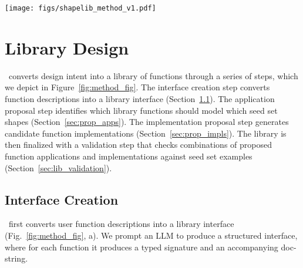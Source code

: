 \begin{figure*}[t!]
\centering
  \texttt{[image: figs/shapelib\_method\_v1.pdf]}
   \caption{Method overview. We design a function library in four steps, starting from a user intent (light blue) that consists of function descriptions and a set of seed shapes. First, (a) we prompt an LLM to create function interfaces that define parameters and annotate the function's purpose. Then, (b) the LLM is prompted to propose multiple applications of the functions that reconstruct the seed shapes. Next, (c) we use this information to guide the LLM to propose multiple function implementations. The library is finalized with a validation step (d) that searches for pairs of  applications and implementations that best reconstruct the seed shapes. We can use the library to extend beyond the seed shapes by guiding the LLM to author a synthetic data generator with the library functions, and using the resulting paired data to train a recognition network for visual program induction.
   } 
  \label{fig:method_fig}
\end{figure*}


\section{Library Design}
\label{sec:lib_design}

\methodname~converts design intent into a library of functions through a series of steps, which we depict in Figure~\ref{fig:method_fig}.
The interface creation step converts function descriptions into a library interface (Section~\ref{sec:lib_interface}). 
The application proposal step identifies which library functions should model which seed set shapes (Section~\ref{sec:prop_apps}).
The implementation proposal step generates candidate function implementations (Section~\ref{sec:prop_impls}).
The library is then finalized with a validation step that checks combinations of proposed function applications and implementations against seed set examples (Section~\ref{sec:lib_validation}). 


\subsection{Interface Creation}
\label{sec:lib_interface}

\methodname~first converts user function descriptions into a library interface (Fig.~\ref{fig:method_fig}, a).
We prompt an LLM to produce a structured interface, where for each function it produces a typed signature and an accompanying doc-string.

